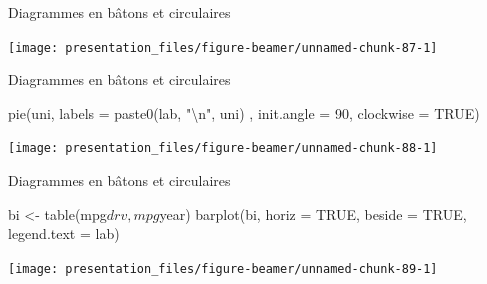 \documentclass[12pt,handout,ignorenonframetext,]{beamer}
\newenvironment{Shaded}{}{}
\newcommand{\KeywordTok}[1]{\textcolor[rgb]{0.00,0.00,1.00}{#1}}
\newcommand{\DataTypeTok}[1]{#1}
\newcommand{\DecValTok}[1]{#1}
\newcommand{\CharTok}[1]{\textcolor[rgb]{0.00,0.50,0.50}{#1}}
\newcommand{\StringTok}[1]{\textcolor[rgb]{0.00,0.50,0.50}{#1}}
\newcommand{\OtherTok}[1]{\textcolor[rgb]{1.00,0.25,0.00}{#1}}
\newcommand{\OperatorTok}[1]{#1}
\newcommand{\NormalTok}[1]{#1}
\renewenvironment{Shaded}{\begin{snugshade}}{\end{snugshade}}
\begin{document}
\begin{frame}[fragile]{Diagrammes en bâtons et circulaires}

\centering \footnotesize

\begin{Shaded}
\end{Shaded}

\texttt{[image: presentation\_files/figure-beamer/unnamed-chunk-87-1]}

\end{frame}

\begin{frame}[fragile]{Diagrammes en bâtons et circulaires}

\centering \footnotesize

\begin{Shaded}
\begin{Highlighting}[]
\KeywordTok{pie}\NormalTok{(uni, }\DataTypeTok{labels =} \KeywordTok{paste0}\NormalTok{(lab, }\StringTok{"}\CharTok{\textbackslash{}n}\StringTok{"}\NormalTok{, uni)}
\NormalTok{    , }\DataTypeTok{init.angle =} \DecValTok{90}\NormalTok{, }\DataTypeTok{clockwise =} \OtherTok{TRUE}\NormalTok{)}
\end{Highlighting}
\end{Shaded}

\texttt{[image: presentation\_files/figure-beamer/unnamed-chunk-88-1]}

\end{frame}

\begin{frame}[fragile]{Diagrammes en bâtons et circulaires}

\centering \footnotesize

\begin{Shaded}
\begin{Highlighting}[]
\NormalTok{bi <-}\StringTok{ }\KeywordTok{table}\NormalTok{(mpg}\OperatorTok{$}\NormalTok{drv, mpg}\OperatorTok{$}\NormalTok{year)}
\KeywordTok{barplot}\NormalTok{(bi, }\DataTypeTok{horiz =} \OtherTok{TRUE}\NormalTok{, }\DataTypeTok{beside =} \OtherTok{TRUE}\NormalTok{, }\DataTypeTok{legend.text =}\NormalTok{ lab)}
\end{Highlighting}
\end{Shaded}

\texttt{[image: presentation\_files/figure-beamer/unnamed-chunk-89-1]}

\end{frame}
\end{document}
